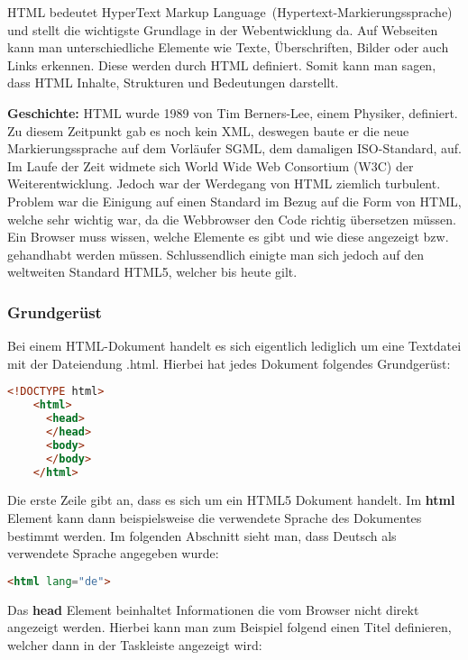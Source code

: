 HTML bedeutet HyperText Markup Language (Hypertext-Markierungssprache) und stellt die wichtigste Grundlage in der Webentwicklung da. Auf Webseiten kann man unterschiedliche Elemente wie Texte, Überschriften, Bilder oder auch Links erkennen. Diese werden durch HTML definiert. Somit kann man sagen, dass HTML Inhalte, Strukturen und Bedeutungen darstellt.

\textbf{Geschichte:}
\newline
HTML wurde 1989 von Tim Berners-Lee, einem Physiker, definiert. Zu diesem Zeitpunkt gab es noch kein XML, deswegen baute er die neue Markierungssprache auf dem Vorläufer SGML, dem damaligen ISO-Standard, auf. Im Laufe der Zeit widmete sich World Wide Web Consortium (W3C) der Weiterentwicklung.
Jedoch war der Werdegang von HTML ziemlich turbulent. Problem war die Einigung auf einen Standard im Bezug auf die Form von HTML, welche sehr wichtig war, da die Webbrowser den Code richtig übersetzen müssen. Ein Browser muss wissen, welche Elemente es gibt und wie diese angezeigt bzw. gehandhabt werden müssen. Schlussendlich einigte man sich jedoch auf den weltweiten Standard HTML5, welcher bis heute gilt.

\subsubsection{Grundgerüst}
Bei einem HTML-Dokument handelt es sich eigentlich lediglich um eine Textdatei mit der Dateiendung .html.
Hierbei hat jedes Dokument folgendes Grundgerüst:

\begin{lstlisting}[language=html, caption=Grundgerüst HTML]
    <!DOCTYPE html>
    <html>
      <head>
      </head>
      <body>
      </body>
    </html>
\end{lstlisting}

Die erste Zeile gibt an, dass es sich um ein HTML5 Dokument handelt. Im \textbf{html} Element kann dann beispielsweise die verwendete Sprache des Dokumentes bestimmt werden.
Im folgenden Abschnitt sieht man, dass Deutsch als verwendete Sprache angegeben wurde:

\begin{lstlisting}[language=html]
    <html lang="de">
\end{lstlisting}

Das \textbf{head} Element beinhaltet Informationen die vom Browser nicht direkt angezeigt werden. 
\newpage
Hierbei kann man zum Beispiel folgend einen Titel definieren, welcher dann in der Taskleiste angezeigt wird:

